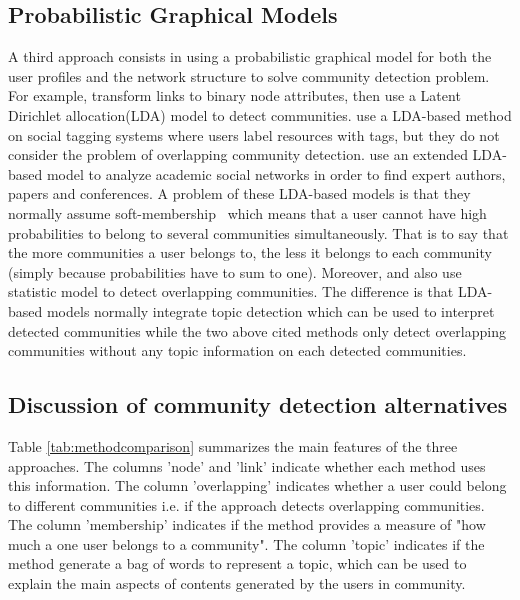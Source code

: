 \subsection{Probabilistic Graphical Models}
A third approach consists in using a probabilistic graphical model for both the user profiles and the network structure to solve community detection problem. For example, \cite{DBLP:conf/isi/ZhangQGFY07} transform links to binary node attributes, then use a Latent Dirichlet allocation(LDA) model to detect communities. \cite{journals/jasis/SunL13} use a LDA-based method on social tagging systems where users label resources with tags, but they do not consider the problem of overlapping community detection.  \cite{tang2008arnetminer} use an extended LDA-based model to analyze academic social networks in order to find expert authors, papers and conferences. A problem of these LDA-based models is that they normally assume soft-membership~\cite{yang2013community} which means that a user cannot have high probabilities to belong to several communities simultaneously. That is to say that the more communities a user belongs to, the less it belongs to each community (simply because probabilities have to sum to one). 
Moreover, \cite{mcdaid2010detecting} and \cite{lancichinetti2011finding} also use statistic model to detect overlapping communities. The difference is that LDA-based models normally integrate topic detection which can be used to interpret detected communities while the two above cited methods only detect overlapping communities without any topic information on each detected communities.

\subsection{Discussion of community detection alternatives}
Table \ref{tab:methodcomparison} summarizes the main features of the three approaches. 
The columns 'node' and 'link' indicate whether each method uses this information.  
The column 'overlapping' indicates whether a user could belong to different communities i.e. if the approach detects overlapping communities.  
The column 'membership' indicates if the method provides a measure of "how much a one user belongs to a community". 
The column 'topic' indicates if the method generate a bag of words to represent a topic, which can be used to explain the main aspects of contents generated by the users in community.


